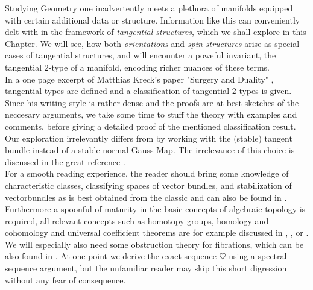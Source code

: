 Studying Geometry one inadvertently meets a plethora of manifolds equipped with certain additional data or structure. 
Information like this can conveniently delt with in the framework of \emph{tangential structures}, which we shall explore in this Chapter.
We will see, how both \emph{orientations} and \emph{spin structures} arise as special cases of tangential structures, and will encounter a poweful invariant, the tangential $2$-type of a manifold, encoding richer nuances of these terms.\\
In a one page excerpt of Matthias Kreck's paper "Surgery and Duality" \cite{kreck:sad}, tangential types are defined and a classification of tangential $2$-types is given.
Since his writing style is rather dense and the proofs are at best sketches of the neccesary arguments, we take some time to stuff the theory with examples and comments, before giving a detailed proof of the mentioned classification result.
Our exploration irrelevantly differs from \cite{kreck:sad} by working with the (stable) tangent bundle instead of a stable normal Gauss Map.
The irrelevance of this choice is discussed in the great reference \cite{stong:cc}.\\
For a smooth reading experience, the reader should bring some knowledge of characteristic classes, classifying spaces of vector bundles, and stabilization of vectorbundles as is best obtained from the classic \cite{ms:cc} and can also be found in \cite{hatcher:vb}.
Furthermore a spoonful of maturity in the basic concepts of algebraic topology is required, all relevant concepts such as homotopy groups, homology and cohomology and universal coefficient theorems are for example discussed in \cite{hatcher:at}, \cite{ttd:at}, or \cite{may:at}.
We will especially also need some obstruction theory for fibrations, which can be also found in \cite{steenrod:fib}.
At one point we derive the exact sequence \hyperref[heartseq]{$\heartsuit$} using a spectral sequence argument, but the unfamiliar reader may skip this short digression without any fear of consequence.

